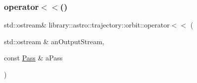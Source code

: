 \subsubsection{\texorpdfstring{operator$<$$<$()}{operator<<()}}
{\footnotesize\ttfamily std\+::ostream\& library\+::astro\+::trajectory\+::orbit\+::operator$<$$<$ (\begin{DoxyParamCaption}\item[{std\+::ostream \&}]{an\+Output\+Stream,  }\item[{const \hyperlink{classlibrary_1_1astro_1_1trajectory_1_1orbit_1_1_pass}{Pass} \&}]{a\+Pass }\end{DoxyParamCaption})}

